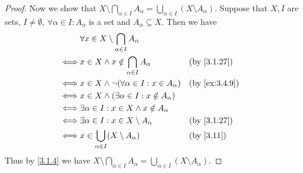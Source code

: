 \begin{proof}
  Now we show that \(X \setminus \bigcap_{\alpha \in I} A_{\alpha} = \bigcup_{\alpha \in I} (X \setminus A_{\alpha})\).
  Suppose that \(X, I\) are sets, \(I \neq \emptyset\), \(\forall \alpha \in I : A_{\alpha}\) is a set and \(A_{\alpha} \subseteq X\).
  Then we have
  \begin{align*}
         & \forall x \in X \setminus \bigcap_{\alpha \in I} A_{\alpha}                               \\
    \iff & x \in X \land x \notin \bigcap_{\alpha \in I} A_{\alpha}     &  & \by{3.1.27}             \\
    \iff & x \in X \land \lnot(\forall \alpha \in I : x \in A_{\alpha}) &  & \by{ex:3.4.9}           \\
    \iff & x \in X \land (\exists \alpha \in I : x \notin A_{\alpha})                                \\
    \iff & \exists \alpha \in I : x \in X \land x \notin A_{\alpha}                                  \\
    \iff & \exists \alpha \in I : x \in X \setminus A_{\alpha}          &  & \by{3.1.27}             \\
    \iff & x \in \bigcup_{\alpha \in I} (X \setminus A_{\alpha})        &  & \text{(by \cref{3.11})} \\
  \end{align*}
  Thus by \cref{3.1.4} we have \(X \setminus \bigcap_{\alpha \in I} A_{\alpha} = \bigcup_{\alpha \in I} (X \setminus A_{\alpha})\).
\end{proof}